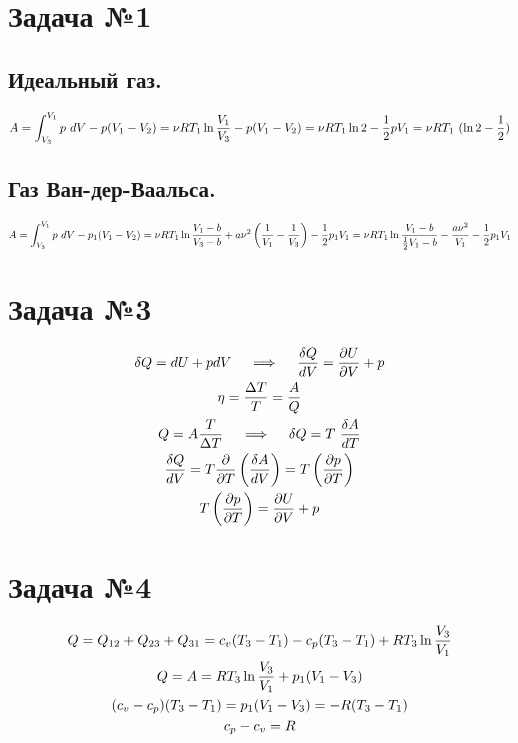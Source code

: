\documentclass[a4paper]{article}
\begin{document}
\section*{Задача №1}
\subsection*{Идеальный газ.}
\begin{gather}
A = \int_{V_3}^{V_1} p \ dV - p(V_1 - V_2) = \nu R T_1 \ln \frac{V_1}{V_3} - p (V_1 - V_2) = \nu R T_1 \ln 2 - \frac{1}{2} p V_1 = \nu R T_1 \ (\ln 2 - \frac{1}{2} ) \notag
\end{gather}

\subsection*{Газ Ван-дер-Ваальса.}
\begin{gather}
A = \int_{V_3}^{V_1} p \ dV - p_1 (V_1 - V_2) = \nu R T_1 \ln \frac{V_1 - b}{V_3 - b} + a \nu^2 \left( \frac{1}{V_1} - \frac{1}{V_3} \right) - \frac{1}{2} p_1 V_1 = \nu R T_1 \ln \frac{V_1 - b}{\frac{1}{2} V_1 - b} - \frac{a \nu^2}{V_1}  - \frac{1}{2} p_1 V_1 \notag
\end{gather}

\section*{Задача №3}
\begin{gather}
\delta Q = dU + pdV \quad \implies \quad \frac{\delta Q}{dV} = \frac{\partial U}{\partial V} + p \notag \\
\eta = \frac{\Delta T}{T} = \frac{A}{Q} \notag \\
Q = A \frac{T}{\Delta T} \quad \implies \quad \delta Q = T \ \frac{\delta A}{dT} \notag \\
\frac{\delta Q}{dV} = T \frac{\partial}{\partial T} \left( \frac{\delta A}{dV} \right) = T \left( \frac{\partial p}{\partial T} \right) \notag \\
T \left( \frac{\partial p}{\partial T} \right) = \frac{\partial U}{\partial V} + p \notag
\end{gather}

\section*{Задача №4}
\begin{gather}
Q = Q_{12} + Q_{23} + Q_{31} = c_v (T_3 - T_1) - c_p (T_3 - T_1) + RT_3 \ln \frac{V_3}{V_1} \notag \\
Q = A = RT_3 \ln \frac{V_3}{V_1} + p_1 (V_1 - V_3) \notag \\
(c_v - c_p) (T_3 - T_1)  = p_1 (V_1 - V_3) = - R (T_3 - T_1) \notag \\
c_p - c_v = R \notag
\end{gather}
\end{document}
